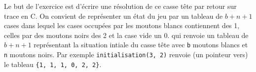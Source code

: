 \begin{Exercise}[title={Casse tête du saute-mouton}]
\begin{center}
    \end{center}
    Le but de l'exercice est d'écrire une résolution de ce casse tête par retour sur trace en C. On convient de représenter un état du jeu par un tableau de $b+n+1$ cases dans lequel les cases occupées par les moutons blancs contiennent des 1, celles par des moutons noirs des 2 et la case vide un 0.
      qui renvoie un tableau de $b+n+1$ représentant la situation intiale du casse tête avec {\tt b} moutons blancs et {\tt n} moutons noirs. Par exemple \texttt{initialisation(3, 2)} renvoie (un pointeur vers) le tableau {\tt \{1, 1, 1, 0, 2, 2\}}.
    \end{Exercise}
  